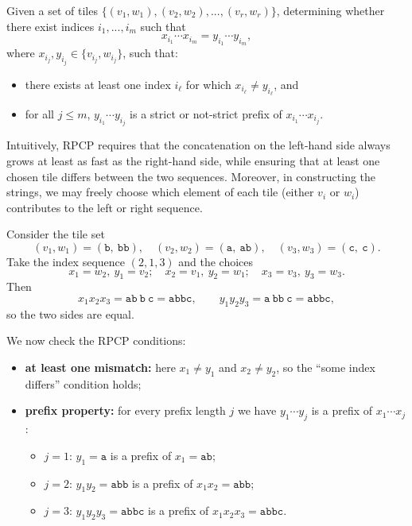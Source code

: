 \bigskip

\begin{definition}
	Given a set of tiles $\{(v_1, w_1), (v_2, w_2), ..., (v_r, w_r)\}$, 
	determining whether there exist indices $i_1, ..., i_m$ such that
	$$x_{i_1}\cdots x_{i_m} = y_{i_1}\cdots y_{i_m},$$
	where $x_{i_j}, y_{i_j} \in \{v_{i_j}, w_{i_j}\}$, such that:
	\begin{itemize}
		\item there exists at least one index $i_\ell$ for which $x_{i_\ell}\neq y_{i_\ell}$, and
		\item for all $j \leq m$, $y_{i_1}\cdots y_{i_j}$ is a strict or 
		not-strict prefix of $x_{i_1}\cdots x_{i_j}$.
	\end{itemize}
\end{definition}

Intuitively, RPCP requires that the concatenation on the left-hand side always 
grows at least as fast as the right-hand side, while ensuring that at least one 
chosen tile differs between the two sequences. Moreover, in constructing the 
strings, we may freely choose which element of each tile (either $v_i$ or $w_i$) 
contributes to the left or right sequence.

\bigskip

\begin{example}\label{exmp:rpcp}
Consider the tile set
\[
(v_1,w_1)=(\texttt{b},\ \texttt{bb}),\quad
(v_2,w_2)=(\texttt{a},\ \texttt{ab}),\quad
(v_3,w_3)=(\texttt{c},\ \texttt{c}).
\]
Take the index sequence $(2,1,3)$ and the choices
\[
x_1 = w_2,\ y_1 = v_2;\quad
x_2 = v_1,\ y_2 = w_1;\quad
x_3 = v_3,\ y_3 = w_3.
\]
Then
\[
x_1 x_2 x_3 = \texttt{ab}\ \texttt{b}\ \texttt{c} = \texttt{abbc},
\qquad
y_1 y_2 y_3 = \texttt{a}\ \texttt{bb}\ \texttt{c} = \texttt{abbc},
\]
so the two sides are equal.

We now check the RPCP conditions:
\begin{itemize}
  \item \textbf{at least one mismatch:} here $x_1\neq y_1$ and
        $x_2\neq y_2$, so the ``some index differs'' condition holds;
  \item \textbf{prefix property:} for every prefix length $j$ we have
        $y_{1}\cdots y_{j}$ is a prefix of $x_{1}\cdots x_{j}$:
        \begin{itemize}
          \item $j=1$: $y_1=\texttt{a}$ is a prefix of $x_1=\texttt{ab}$;
          \item $j=2$: $y_1y_2=\texttt{abb}$ is a prefix of $x_1x_2=\texttt{abb}$;
          \item $j=3$: $y_1y_2y_3=\texttt{abbc}$ is a prefix of $x_1x_2x_3=\texttt{abbc}$.
        \end{itemize}
\end{itemize}
\end{example}

